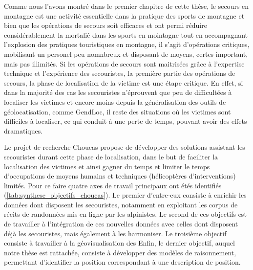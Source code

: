 Comme nous l'avons montré dans le premier chapitre de cette thèse, le
secours en montagne est une activité essentielle dans la pratique des
sports de montagne et bien que les opérations de secours soit
efficaces et ont permi réduire considérablement la mortalié dans les
sports en mointagne tout en accompagnant l'explosion des pratiques
touristiques en montagne, il s'agit d'opérations critiques, mobilisant
un personel peu nomnbreux et disposant de moyens, certes important,
mais pas illimités. Si les opérations de secours sont maitrisées grâce
à l'expertise technique et l'expérience des secouristes,
%
la première partie des opérations de secours, \ie la phase de
localisation de la victime est une étape critique. En effet, si dans
la majorité des cas les secouristes n'éprouvent que peu de
difficultées à localiser les victimes et encore moins depuis la
généralisation des outils de géolocatisation, comme GendLoc, il reste
des situations où les victimes sont difficiles à localiser, ce qui
conduit à une perte de temps, pouvant avoir des effets dramatiques.

Le projet de recherche Choucas propose de développer des solutions
assistant les secouristes durant cette phase de localisation, dans le
but de faciliter la localisation des victimes et ainsi gagner du temps
et limiter le temps d'occupations de moyens humains et techniques
(hélicoptères d'interventions) limités. Pour ce faire quatre axes de
travail principaux ont étés identifiés
(\autoref{tab:synthese_objectifs_choucas}). Le premier d'entre-eux
consiste à enrichir les données dont disposent les secouristes,
notamment en exploitant les corpus de récits de randonnées mis en
ligne par les alpinistes. Le second de ces objectifs est de travailler
à l'intégration de ces nouvelles données avec celles dont disposent
déjà les secouristes, mais également à les harmoniser. Le troisième
objectif consiste à travailler à la géovisualisation des Enfin, le
dernier objectif, auquel notre thèse est rattachée, consiste à
développer des modèles de raisonnement, permettant d'identifier la
position correspondant à une description de position.

